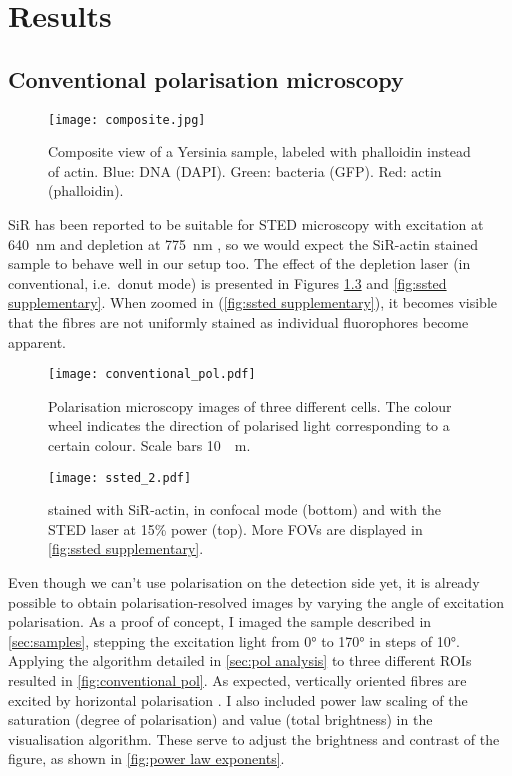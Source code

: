 \chapter{Results}

\section{Conventional polarisation microscopy}
\label{sec:conventional pol}
\begin{figure}
	\centering
	\texttt{[image: composite.jpg]}
	\caption{
		Composite view of a Yersinia sample, labeled with phalloidin instead of actin. Blue: DNA (DAPI). Green: bacteria (GFP). Red: actin (phalloidin).
	}
	\label{fig:composite}
\end{figure}

SiR has been reported to be suitable for STED microscopy with excitation at 640~nm and depletion at 775~nm \cite{DEste2015}, so we would expect the SiR-actin stained sample to behave well in our setup too. The effect of the depletion laser (in conventional, i.e.~donut mode) is presented in Figures \ref{fig:ssted} and \ref{fig:ssted supplementary}. When zoomed in (\autoref{fig:ssted supplementary}), it becomes visible that the fibres are not uniformly stained as individual fluorophores become apparent.

\begin{figure}
	\centering
	\texttt{[image: conventional\_pol.pdf]}
	\caption{
		Polarisation microscopy images of three different cells. The colour wheel indicates the direction of polarised light corresponding to a certain colour. Scale bars \SI{10}{\mu m}. 
	}
	\label{fig:conventional pol}
\end{figure}

\begin{figure}
	\centering
	\texttt{[image: ssted\_2.pdf]}
	\caption{
	 stained with SiR-actin, in confocal mode (bottom) and with the STED laser at 15\% power (top). More FOVs are displayed in \autoref{fig:ssted supplementary}.
	}
	\label{fig:ssted}
\end{figure}

Even though we can't use polarisation on the detection side yet, it is already possible to obtain polarisation-resolved images by varying the angle of excitation polarisation. As a proof of concept, I imaged the sample described in \autoref{sec:samples}, stepping the excitation light from \ang{0} to \ang{170} in steps of \ang{10}. Applying the algorithm detailed in \autoref{sec:pol analysis} to three different ROIs resulted in \autoref{fig:conventional pol}. As expected, vertically oriented fibres are excited by horizontal polarisation \cite{Spira2017}.
I also included power law scaling of the saturation (degree of polarisation) and value (total brightness) in the visualisation algorithm. These serve to adjust the brightness and contrast of the figure, as shown in \autoref{fig:power law exponents}.

